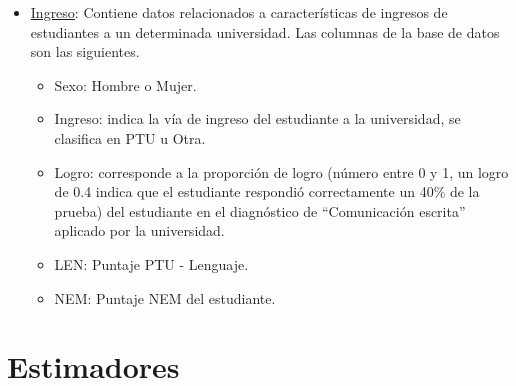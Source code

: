 \documentclass[
  11pt,
]{book}
\providecommand{\tightlist}{%
  \setlength{\itemsep}{0pt}\setlength{\parskip}{0pt}}
\theoremstyle{definition}
\theoremstyle{definition}
\theoremstyle{definition}
\theoremstyle{definition}
\theoremstyle{remark}
\begin{document}
\begin{itemize}
  \begin{itemize}
  \tightlist
  \item
    age: edad del paciente (en años).
  \item
    sex: sexo del paciente (Hombre: 1 y Mujer: 0).
  \item
    cp: Tipo de dolor en el pecho, Valor 1: angina típica, Valor 2: angina atípica, Valor 3: dolor no anginoso, Valor 4: asintomático.
  \item
    trtbps: presión arterial en reposo (en mm Hg).
  \item
    chol: nivel de colestorol (en mg/dl).
  \item
    fbs: azúcar en sangre en ayunas \(>\) 120 mg/dl (V = 1; F = 0).
  \item
    thalachh: frecuencia cardíaca máxima alcanzada (en latidos por minuto).
  \item
    oldpeak: tiempo de duración del último ataque al corazón (en minutos).
  \end{itemize}
\item
  \label{Ingreso}\href{https://raw.githubusercontent.com/Dfranzani/Bases-de-datos-para-cursos/main/2023-1/Ingreso\%2Buniversidad.csv}{Ingreso}: Contiene datos relacionados a características de ingresos de estudiantes a un determinada universidad. Las columnas de la base de datos son las siguientes.

  \begin{itemize}
  \tightlist
  \item
    Sexo: Hombre o Mujer.
  \item
    Ingreso: indica la vía de ingreso del estudiante a la universidad, se clasifica en PTU u Otra.
  \item
    Logro: corresponde a la proporción de logro (número entre 0 y 1, un logro de 0.4 indica que el estudiante respondió correctamente un 40\% de la prueba) del estudiante en el diagnóstico de ``Comunicación escrita'' aplicado por la universidad.
  \item
    LEN: Puntaje PTU - Lenguaje.
  \item
    NEM: Puntaje NEM del estudiante.
  \end{itemize}
\end{itemize}

\appendix {}


\chapter{Estimadores}\label{estimadores}
\end{document}

